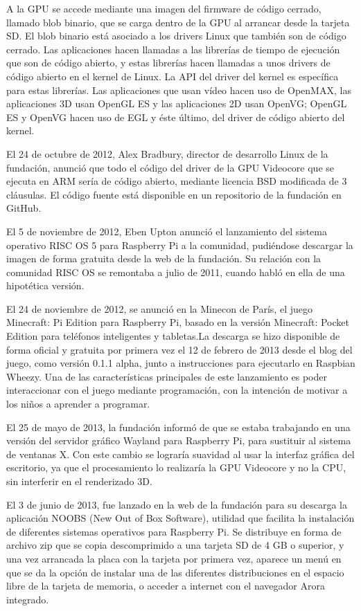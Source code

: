 \documentclass[a4paper,11pt,oneside]{book}
\begin{document}
A la GPU se accede mediante una imagen del firmware de código cerrado, llamado blob binario, que se carga dentro de la GPU al arrancar desde la tarjeta SD. El blob binario está asociado a los drivers Linux que también son de código cerrado. Las aplicaciones hacen llamadas a las librerías de tiempo de ejecución que son de código abierto, y estas librerías hacen llamadas a unos drivers de código abierto en el kernel de Linux. La API del driver del kernel es específica para estas librerías. Las aplicaciones que usan vídeo hacen uso de OpenMAX, las aplicaciones 3D usan OpenGL ES y las aplicaciones 2D usan OpenVG; OpenGL ES y OpenVG hacen uso de EGL y éste último, del driver de código abierto del kernel.

El 24 de octubre de 2012, Alex Bradbury, director de desarrollo Linux de la fundación, anunció que todo el código del driver de la GPU Videocore que se ejecuta en ARM sería de código abierto, mediante licencia BSD modificada de 3 cláusulas. El código fuente está disponible en un repositorio de la fundación en GitHub.

El 5 de noviembre de 2012, Eben Upton anunció el lanzamiento del sistema operativo RISC OS 5 para Raspberry Pi a la comunidad, pudiéndose descargar la imagen de forma gratuita desde la web de la fundación. Su relación con la comunidad RISC OS se remontaba a julio de 2011, cuando habló en ella de una hipotética versión.

El 24 de noviembre de 2012, se anunció en la Minecon de París, el juego Minecraft: Pi Edition para Raspberry Pi, basado en la versión Minecraft: Pocket Edition para teléfonos inteligentes y tabletas.La descarga se hizo disponible de forma oficial y gratuita por primera vez el 12 de febrero de 2013 desde el blog del juego, como versión 0.1.1 alpha, junto a instrucciones para ejecutarlo en Raspbian Wheezy. Una de las características principales de este lanzamiento es poder interaccionar con el juego mediante programación, con la intención de motivar a los niños a aprender a programar.

El 25 de mayo de 2013, la fundación informó de que se estaba trabajando en una versión del servidor gráfico Wayland para Raspberry Pi, para sustituir al sistema de ventanas X. Con este cambio se lograría suavidad al usar la interfaz gráfica del escritorio, ya que el procesamiento lo realizaría la GPU Videocore y no la CPU, sin interferir en el renderizado 3D.

El 3 de junio de 2013, fue lanzado en la web de la fundación para su descarga la aplicación NOOBS (New Out of Box Software), utilidad que facilita la instalación de diferentes sistemas operativos para Raspberry Pi. Se distribuye en forma de archivo zip que se copia descomprimido a una tarjeta SD de 4 GB o superior, y una vez arrancada la placa con la tarjeta por primera vez, aparece un menú en que se da la opción de instalar una de las diferentes distribuciones en el espacio libre de la tarjeta de memoria, o acceder a internet con el navegador Arora integrado. 
\end{document}
